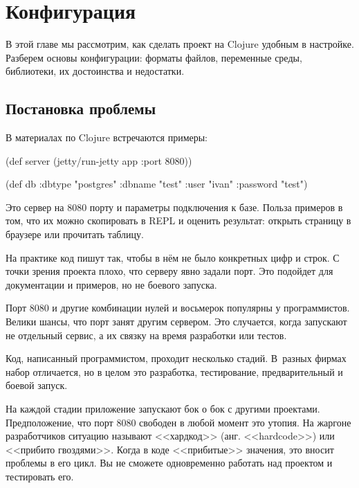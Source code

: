 \chapter{Конфигурация}


\label{chapter-config}

\begin{teaser}
В этой главе мы рассмотрим, как сделать проект на Clojure удобным в
настройке. Разберем основы конфигурации: форматы файлов, переменные среды,
библиотеки, их достоинства и недостатки.
\end{teaser}

\section{Постановка проблемы}

В материалах по Clojure встречаются примеры:

\begin{english}
  \begin{clojure}
(def server
  (jetty/run-jetty app {:port 8080}))

(def db {:dbtype   "postgres"
         :dbname   "test"
         :user     "ivan"
         :password "test"})
  \end{clojure}
\end{english}

Это сервер на 8080 порту и параметры подключения к базе. Польза примеров в том,
что их можно скопировать в REPL и оценить результат: открыть страницу в браузере
или прочитать таблицу.

На практике код пишут так, чтобы в н\"{е}м не было конкретных цифр и строк. С точки
зрения проекта плохо, что серверу явно задали порт. Это подойдет для
документации и примеров, но не боевого запуска.

Порт 8080 и другие комбинации нулей и восьмерок популярны у
программистов. Велики шансы, что порт занят другим сервером. Это случается,
когда запускают не отдельный сервис, а их связку на время разработки или тестов.

Код, написанный программистом, проходит несколько стадий. В~разных фирмах набор
отличается, но в целом это разработка, тестирование, предварительный и боевой
запуск.


На каждой стадии приложение запускают бок о бок с другими
проектами. Предположение, что порт 8080 свободен в любой момент это утопия. На
жаргоне разработчиков ситуацию называют <<хардкод>> (анг. <<hardcode>>) или
<<прибито гвоздями>>. Когда в коде <<прибитые>> значения, это вносит проблемы в
его цикл. Вы не сможете одновременно работать над проектом и тестировать его.

